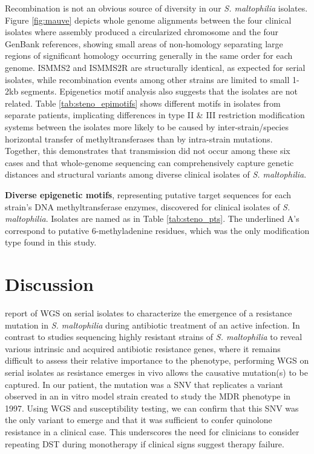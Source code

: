 Recombination is not an obvious source of diversity in our \emph{S. maltophilia} isolates. Figure \ref{fig:mauve} depicts whole genome alignments between the four clinical isolates where assembly produced a circularized chromosome and the four GenBank references, showing small areas of non-homology separating large regions of significant homology occurring generally in the same order for each genome. ISMMS2 and ISMMS2R are structurally identical, as expected for serial isolates, while recombination events among other strains are limited to small 1-2kb segments. Epigenetics motif analysis also suggests that the isolates are not related. Table \ref{tab:steno_epimotifs} shows different motifs in isolates from separate patients, implicating differences in type II \& III restriction modification systems between the isolates more likely to be caused by inter-strain/species horizontal transfer of methyltransferases than by intra-strain mutations.\autocite{Srikhanta2010} Together, this demonstrates that transmission did not occur among these six cases and that whole-genome sequencing can comprehensively capture genetic distances and structural variants among diverse clinical isolates of \emph{S. maltophilia}.

\begin{table}[ht]
  
  \caption[Epigenetic motifs for clinical isolates of \emph{S. maltophilia}]{\textbf{Diverse epigenetic motifs}, representing putative target sequences for each strain’s DNA methyltransferase enzymes, discovered for clinical isolates of \emph{S. maltophilia}.  Isolates are named as in Table \ref{tab:steno_pts}. The underlined A’s correspond to putative 6-methyladenine residues, which was the only modification type found in this study.}
  \label{tab:steno_epimotifs}
\end{table}

\section{Discussion}

 report of WGS on serial isolates to characterize the emergence of a resistance mutation in \emph{S. maltophilia} during antibiotic treatment of an active infection. In contrast to studies sequencing highly resistant strains of \emph{S. maltophilia} to reveal various intrinsic and acquired antibiotic resistance genes,\autocite{Crossman2008,Zhao2015} where it remains difficult to assess their relative importance to the phenotype, performing WGS on serial isolates as resistance emerges in vivo allows the causative mutation(s) to be captured. In our patient, the mutation was a SNV that replicates a variant observed in an in vitro model strain created to study the MDR phenotype in 1997.\autocite{Alonso1997} Using WGS and susceptibility testing, we can confirm that this SNV was the only variant to emerge and that it was sufficient to confer quinolone resistance in a clinical case. This underscores the need for clinicians to consider repeating DST during monotherapy if clinical signs suggest therapy failure.

